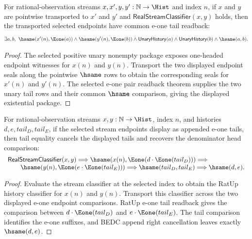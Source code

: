 \begin{theorem}
\label{thm:real-stream-classifier-transport-selected-endpoint-common-e1-tail-readback}
For rational-observation streams $x,x',y,y':\mathbb{N}\to\Hist$ and index $n$,
if $x$ and $y$ are pointwise transported to $x'$ and $y'$ and
$\mathsf{RealStreamClassifier}(x,y)$ holds, then the transported selected
endpoints have common e-one tail readback:
$$
\exists a,b,\ \hsame(x'(n),\Eone(a))\land \hsame(y'(n),\Eone(b))\land
\mathsf{UnaryHistory}(a)\land \mathsf{UnaryHistory}(b)\land \hsame(a,b).
$$
\end{theorem}
\begin{proof}
The selected positive unary nonempty package exposes one-headed endpoint
witnesses for $x(n)$ and $y(n)$. Transport the two displayed endpoint seals
along the pointwise $\hsame$ rows to obtain the corresponding seals for
$x'(n)$ and $y'(n)$. The selected e-one pair readback theorem supplies the two
unary tail rows and their common $\hsame$ comparison, giving the displayed
existential package.
\end{proof}

\begin{theorem}
\label{thm:real-stream-classifier-selected-append-e1-tail-hsame-cancel}
For rational-observation streams $x,y:\mathbb{N}\to\Hist$, index $n$, and
histories $d,e,tail_D,tail_E$, if the selected stream endpoints display as
appended e-one tails, then tail equality cancels the displayed tails and
recovers the denominator head comparison:
$$
\begin{array}{l}
\mathsf{RealStreamClassifier}(x,y)\Longrightarrow
\hsame(x(n),\Eone(d\cdot\Eone(tail_D)))\Longrightarrow\\
\qquad
\hsame(y(n),\Eone(e\cdot\Eone(tail_E)))\Longrightarrow
\hsame(tail_D,tail_E)\Longrightarrow
\hsame(d,e).
\end{array}
$$
\end{theorem}
\begin{proof}
Evaluate the stream classifier at the selected index to obtain the RatUp
history classifier for $x(n)$ and $y(n)$. Transport this classifier across the
two displayed e-one endpoint comparisons. RatUp e-one tail readback gives the
comparison between $d\cdot\Eone(tail_D)$ and $e\cdot\Eone(tail_E)$. The tail
comparison identifies the e-one suffixes, and BEDC append right cancellation
leaves exactly $\hsame(d,e)$.
\end{proof}
